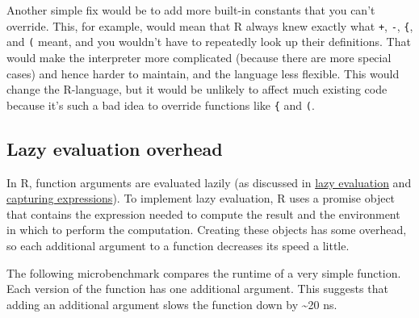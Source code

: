 Another simple fix would be to add more built-in constants that you
can't override. This, for example, would mean that R always knew exactly
what \texttt{+}, \texttt{-}, \texttt{\{}, and \texttt{(} meant, and you
wouldn't have to repeatedly look up their definitions. That would make
the interpreter more complicated (because there are more special cases)
and hence harder to maintain, and the language less flexible. This would
change the R-language, but it would be unlikely to affect much existing
code because it's such a bad idea to override functions like \texttt{\{}
and \texttt{(}.

\subsection{Lazy evaluation overhead}

In R, function arguments are evaluated lazily (as discussed in
\hyperref[lazy-evaluation]{lazy evaluation} and
\hyperref[capturing-expressions]{capturing expressions}). To implement
lazy evaluation, R uses a promise object that contains the expression
needed to compute the result and the environment in which to perform the
computation. Creating these objects has some overhead, so each
additional argument to a function decreases its speed a little.

The following microbenchmark compares the runtime of a very simple
function. Each version of the function has one additional argument. This
suggests that adding an additional argument slows the function down by
\textasciitilde{}20 ns.

